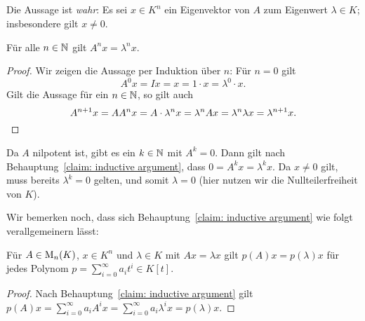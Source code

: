 \subsection{}
\label{subsection: eigenvalues of nilpotent matrix}

Die Aussage ist \emph{wahr}:
Es sei $x \in K^n$ ein Eigenvektor von $A$ zum Eigenwert $\lambda \in K$;
insbesondere gilt $x \neq 0$.

\begin{claim}
  \label{claim: inductive argument}
  Für alle $n \in \mathbb{N}$ gilt $A^n x = \lambda^n x$.
\end{claim}
\begin{proof}
  Wir zeigen die Aussage per Induktion über $n$:
  Für $n = 0$ gilt
  \[
      A^0 x
    = I x
    = x
    = 1 \cdot x
    = \lambda^0 \cdot x.
  \]
  Gilt die Aussage für ein $n \in \mathbb{N}$, so gilt auch
  \[
      A^{n+1} x
    = A A^n x
    = A \cdot \lambda^n x
    = \lambda^n A x
    = \lambda^n \lambda x
    = \lambda^{n+1} x.
  \qedhere
  \]
\end{proof}

Da $A$ nilpotent ist, gibt es ein $k \in \mathbb{N}$ mit $A^k = 0$.
Dann gilt nach Behauptung~\ref{claim: inductive argument}, dass $0 = A^k x = \lambda^k x$.
Da $x \neq 0$ gilt, muss bereits $\lambda^k = 0$ gelten, und somit $\lambda = 0$ (hier nutzen wir die Nullteilerfreiheit von $K$).

Wir bemerken noch, dass sich Behauptung~\ref{claim: inductive argument} wie folgt verallgemeinern lässt:

\begin{lemma}
  Für $A \in \operatorname{M}_{n}(K)$, $x \in K^n$ und $\lambda \in K$ mit $Ax = \lambda x$ gilt $p(A) x = p(\lambda) x$ für jedes Polynom $p = \sum_{i=0}^\infty a_i t^i \in K[t]$.
\end{lemma}

\begin{proof}
  Nach Behauptung~\ref{claim: inductive argument} gilt $p(A) x = \sum_{i=0}^\infty a_i A^i x = \sum_{i=0}^\infty a_i \lambda^i x = p(\lambda) x$.
\end{proof}





\subsection{}
\label{subsection: nonzero nilpotent matrices are not diagonalizable}

